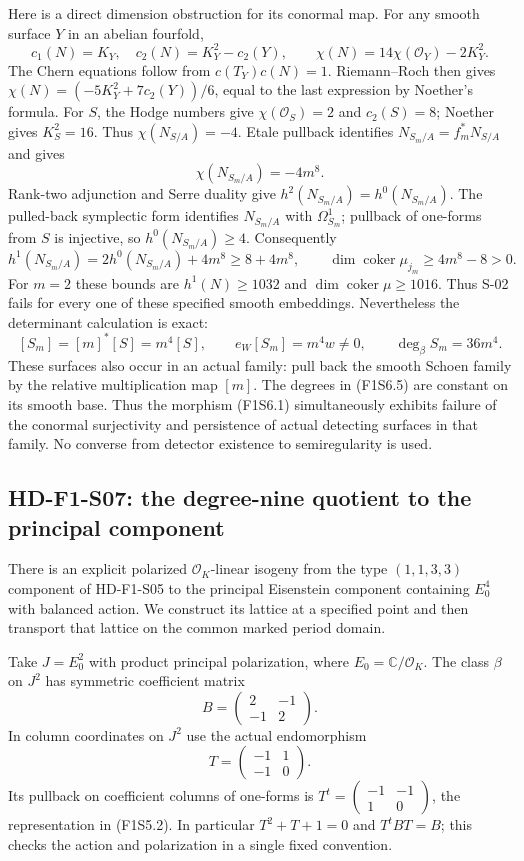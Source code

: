 Here is a direct dimension obstruction for its conormal map.
For any smooth surface $Y$ in an abelian fourfold,
\[
 c_1(N)=K_Y,\quad c_2(N)=K_Y^2-c_2(Y),\qquad
 \chi(N)=14\chi(\mathcal O_Y)-2K_Y^2.
 \tag{F1S6.2}
\]
The Chern equations follow from $c(T_Y)c(N)=1$. Riemann--Roch
then gives $\chi(N)=(-5K_Y^2+7c_2(Y))/6$, equal to the last
expression by Noether's formula. For $S$, the Hodge numbers
give $\chi(\mathcal O_S)=2$ and $c_2(S)=8$; Noether gives
$K_S^2=16$. Thus $\chi(N_{S/A})=-4$.
Etale pullback identifies $N_{S_m/A}=f_m^*N_{S/A}$ and gives
\[
 \chi(N_{S_m/A})=-4m^8.
 \tag{F1S6.3}
\]
Rank-two adjunction and Serre duality give
$h^2(N_{S_m/A})=h^0(N_{S_m/A})$. The pulled-back symplectic
form identifies $N_{S_m/A}$ with $\Omega_{S_m}^1$; pullback
of one-forms from $S$ is injective, so $h^0(N_{S_m/A})\ge4$.
Consequently
\[
 h^1(N_{S_m/A})=2h^0(N_{S_m/A})+4m^8\ge8+4m^8,
 \qquad
 \dim\operatorname{coker}\mu_{j_m}\ge4m^8-8>0.
 \tag{F1S6.4}
\]
For $m=2$ these bounds are $h^1(N)\ge1032$ and
$\dim\operatorname{coker}\mu\ge1016$. Thus S-02 fails for
every one of these specified smooth embeddings.
Nevertheless the determinant calculation is exact:
\[
 [S_m]=[m]^*[S]=m^4[S],\qquad e_W[S_m]=m^4w\ne0,
 \qquad \deg_\beta S_m=36m^4.
 \tag{F1S6.5}
\]
These surfaces also occur in an actual family: pull back the
smooth Schoen family by the relative multiplication map $[m]$.
The degrees in (F1S6.5) are constant on its smooth base.
Thus the morphism (F1S6.1) simultaneously exhibits failure of
the conormal surjectivity and persistence of actual detecting
surfaces in that family. No converse from detector existence
to semiregularity is used.

\subsection{HD-F1-S07: the degree-nine quotient to the principal component}

There is an explicit polarized $\mathcal O_K$-linear isogeny from
the type $(1,1,3,3)$ component of HD-F1-S05 to the principal
Eisenstein component containing $E_0^4$ with balanced action.
We construct its lattice at a specified point and then transport
that lattice on the common marked period domain.

Take $J=E_0^2$ with product principal polarization, where
$E_0=\mathbb C/\mathcal O_K$. The class $\beta$ on $J^2$
has symmetric coefficient matrix
\[
 B=\begin{pmatrix}2&-1\\-1&2\end{pmatrix}.
\]
In column coordinates on $J^2$ use the actual endomorphism
\[
 T=\begin{pmatrix}-1&1\\-1&0\end{pmatrix}.
 \tag{F1S7.1}
\]
Its pullback on coefficient columns of one-forms is
$T^t=\left(\begin{smallmatrix}-1&-1\\1&0\end{smallmatrix}\right)$,
the representation in (F1S5.2). In particular
$T^2+T+1=0$ and $T^tBT=B$; this checks the action and
polarization in a single fixed convention.

